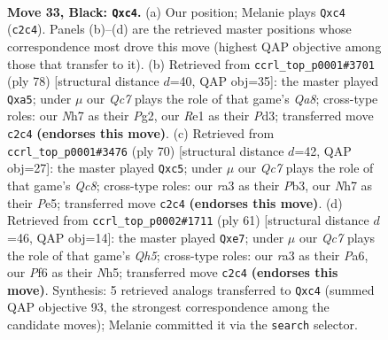 \documentclass[11pt]{article}
\begin{document}
\clearpage

\begin{figure}[p]\centering
\begin{subfigure}{0.46\textwidth}\centering
\resizebox{\linewidth}{!}{%
\newchessgame
\chessboard[
  setfen={7k/p2p3n/2p2p2/7Q/1PPP4/R7/2q2PKP/4r3 b - - 3 33},
  showmover=false,
  pgfstyle=straightmove, color=movearrow, markmove={c2-c4}
]}
\caption{}
\end{subfigure}\hfill
\begin{subfigure}{0.46\textwidth}\centering
\resizebox{\linewidth}{!}{%
\newchessgame
\chessboard[
  setfen={Q7/5ppk/8/p3p2p/P3P3/3P4/1P3qPK/8 w - - 10 40},
  showmover=false,
  pgfstyle=straightmove, color=movearrow, markmove={a8-a5}
]}
\caption{}
\end{subfigure}
\\[4pt]
\begin{subfigure}{0.46\textwidth}\centering
\resizebox{\linewidth}{!}{%
\newchessgame
\chessboard[
  setfen={2Q5/p5pk/4p2p/2p1Pq2/7P/1P4P1/P5K1/8 w - - 2 36},
  showmover=false,
  pgfstyle=straightmove, color=movearrow, markmove={c8-c5}
]}
\caption{}
\end{subfigure}\hfill
\begin{subfigure}{0.46\textwidth}\centering
\resizebox{\linewidth}{!}{%
\newchessgame
\chessboard[
  setfen={8/1p2Pk1p/p5p1/7n/4p2q/P7/1PP3Q1/1K1R4 b - - 0 31},
  showmover=false,
  pgfstyle=straightmove, color=movearrow, markmove={h4-e7}
]}
\caption{}
\end{subfigure}
\caption{\textbf{Move 33, Black: \texttt{Qxc4}.} (a) Our position; Melanie plays \texttt{Qxc4} (\texttt{c2c4}). Panels (b)--(d) are the retrieved master positions whose correspondence most drove this move (highest QAP objective among those that transfer to it). (b) Retrieved from \texttt{ccrl\_top\_p0001\#3701} (ply 78) [structural distance $d$=40, QAP obj=35]: the master played \texttt{Qxa5}; under $\mu$ our \emph{Qc7} plays the role of that game's \emph{Qa8}; cross-type roles: our \emph{N}h7 as their \emph{P}g2, our \emph{R}e1 as their \emph{P}d3; transferred move \texttt{c2c4} \textbf{(endorses this move)}. (c) Retrieved from \texttt{ccrl\_top\_p0001\#3476} (ply 70) [structural distance $d$=42, QAP obj=27]: the master played \texttt{Qxc5}; under $\mu$ our \emph{Qc7} plays the role of that game's \emph{Qc8}; cross-type roles: our \emph{r}a3 as their \emph{P}b3, our \emph{N}h7 as their \emph{P}e5; transferred move \texttt{c2c4} \textbf{(endorses this move)}. (d) Retrieved from \texttt{ccrl\_top\_p0002\#1711} (ply 61) [structural distance $d$=46, QAP obj=14]: the master played \texttt{Qxe7}; under $\mu$ our \emph{Qc7} plays the role of that game's \emph{Qh5}; cross-type roles: our \emph{r}a3 as their \emph{P}a6, our \emph{P}f6 as their \emph{N}h5; transferred move \texttt{c2c4} \textbf{(endorses this move)}. Synthesis: 5 retrieved analogs transferred to \texttt{Qxc4} (summed QAP objective 93, the strongest correspondence among the candidate moves); Melanie committed it via the \texttt{search} selector.}
\label{fig:thought-m65}
\end{figure}
\end{document}
